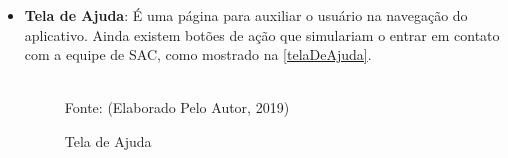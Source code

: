 \begin{itemize}
	\item \textbf{Tela de Ajuda}: É uma página para auxiliar o usuário na navegação do aplicativo. Ainda existem botões de ação que simulariam o entrar em contato com a equipe de SAC, como mostrado na \autoref{telaDeAjuda}.
	\begin{figure}[!htpb]
		\centering
		\caption{Tela de Ajuda}
		\\
		Fonte: (Elaborado Pelo Autor, 2019)
		\label{telaDeAjuda}
	\end{figure}
\end{itemize}

